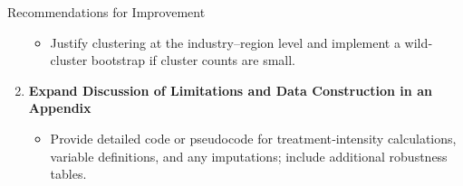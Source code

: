 \documentclass{beamer}
\begin{document}
\begin{frame}{Recommendations for Improvement}
\begin{enumerate}
      \begin{itemize}
        \item Justify clustering at the industry–region level and implement a wild‐cluster bootstrap if cluster counts are small.
      \end{itemize}
    \item \textbf{Expand Discussion of Limitations and Data Construction in an Appendix}
      \begin{itemize}
        \item Provide detailed code or pseudocode for treatment‐intensity calculations, variable definitions, and any imputations; include additional robustness tables.
      \end{itemize}
  \end{enumerate}
\end{frame}
\end{document}
